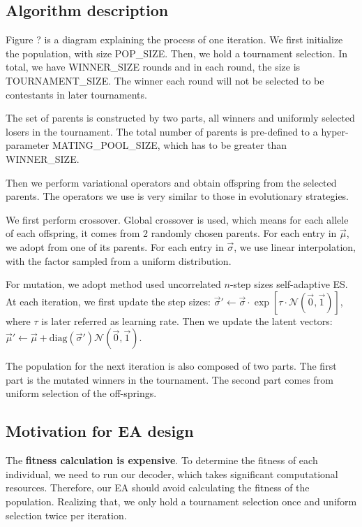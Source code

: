 \documentclass[manuscript,screen,review]{acmart}
\begin{document}
\subsection{Algorithm description}

Figure ? is a diagram explaining the process of one iteration. We first initialize the population, with size POP\_SIZE. Then, we hold a tournament selection. In total, we have WINNER\_SIZE rounds and in each round, the size is TOURNAMENT\_SIZE. The winner each round will not be selected to be contestants in later tournaments.

The set of parents is constructed by two parts, all winners and uniformly selected losers in the tournament. The total number of parents is pre-defined to a hyper-parameter MATING\_POOL\_SIZE, which has to be greater than WINNER\_SIZE.

Then we perform variational operators and obtain offspring from the selected parents. The operators we use is very similar to those in evolutionary strategies. 

\indent\indent We first perform crossover. Global crossover is used, which means for each allele of each offspring, it comes from 2 randomly chosen parents. For each entry in $\vec{\mu}$, we adopt from one of its parents. For each entry in $\vec{\sigma}$, we use linear interpolation, with the factor sampled from a uniform distribution.

\indent\indent For mutation, we adopt method used uncorrelated $n$-step sizes self-adaptive ES. At each iteration, we first update the step sizes: $\vec{\sigma}'\leftarrow\vec{\sigma}\cdot\exp[\tau\cdot \mathcal{N}(\vec{0},\vec{1})]$, where $\tau$ is later referred as learning rate. Then we update the latent vectors: $\vec{\mu}'\leftarrow\vec{\mu}+\mathrm{diag}(\vec\sigma')\mathcal{N(\vec{0},\vec{1})}$.

The population for the next iteration is also composed of two parts. The first part is the mutated winners in the tournament. The second part comes from uniform selection of the off-springs.

\subsection{Motivation for EA design}

The \textbf{fitness calculation is expensive}. To determine the fitness of each individual, we need to run our decoder, which takes significant computational resources. Therefore, our EA should avoid calculating the fitness of the population. Realizing that, we only hold a tournament selection once and uniform selection twice per iteration.
\end{document}
